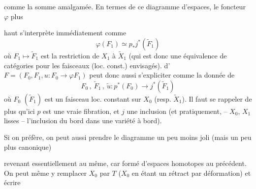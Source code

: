 \documentclass[11pt,a4paper]{article}
\begin{document}

comme la somme amalgamée. En termes de ce diagramme d'espaces, le foncteur $\varphi$ plus

haut s'interprète immédiatement comme
\[
\varphi(F_1) \simeq p_* j^*(\tilde{F}_1)
\]
où $F_1 \mapsto \tilde{F}_1$ est la restriction de $X_1$ à $\tilde{X}_1$ (qui est donc une équivalence de catégories pour les faisceaux (loc. const.) envisagés).   d'\struck{\ill{}} $F = (F_0, F_1, u : F_0 \to \varphi F_1)$ peut donc aussi s'expliciter comme la donnée de
\[
F_0 \,,\ \tilde{F}_1 \,,\ \tilde{u} : p^*(F_0) \to j^*(\tilde{F}_1)
\]
où $F_0$ $(\tilde{F}_1)$ est un faisceau loc. constant sur $X_0$ (resp. $\tilde{X}_1$). Il faut se rappeler de plus qu'ici $p$ est une vraie fibration, et $j$ une inclusion (et pratiquement, --  $X_0$, $X_1$ lisses -- \struck{\ill{}} l'inclusion du bord dans une variété à bord).

Si on préfère, on peut aussi prendre le diagramme un peu moins joli (mais un peu plus canonique)


revenant essentiellement au même, car formé d'espaces homotopes au précédent. On peut même y remplacer $X_0$ par $T$ ($X_0$ en étant un rétract par déformation) et écrire


\end{document}
